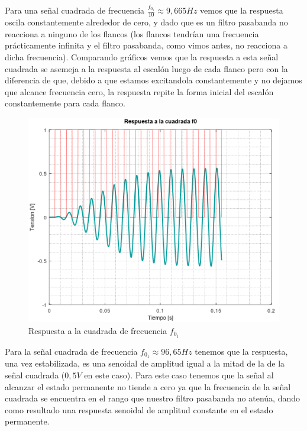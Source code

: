 \documentclass[11pt,a4paper]{report}
\begin{document}
Para una señal cuadrada de frecuencia $\frac{f_{0_{1}}}{10} \approx 9,665Hz$ vemos que 
la respuesta oscila constantemente alrededor de cero, y dado que es un filtro pasabanda no reacciona a ninguno de los flancos (los flancos tendrían una frecuencia
prácticamente infinita y el filtro pasabanda, como vimos antes, no reacciona a dicha frecuencia). Comparando gráficos vemos que la respuesta a esta señal cuadrada se asemeja a la respuesta al escalón luego de cada flanco pero con la diferencia de que, debido a que estamos excitandola constantemente y no dejamos que alcance frecuencia cero, la respuesta repite la forma inicial del escalón constantemente para cada flanco.

\bigskip
\begin{figure}[h!]
\includegraphics[scale=1]{RtaCuadradaWo12.png}
\caption{Respuesta a la cuadrada de frecuencia $f_{0_{1}}$}
\end{figure}

Para la señal cuadrada de frecuencia $f_{0_{1}} \approx 96,65Hz$ tenemos que la 
respuesta, una vez estabilizada, es una senoidal de amplitud igual a la mitad de la 
de la señal cuadrada ($0,5V$ en este caso). Para este caso tenemos que la señal al alcanzar el estado permanente no tiende a cero ya que la frecuencia de la señal cuadrada se encuentra en el rango que nuestro filtro pasabanda no atenúa, dando como resultado una respuesta senoidal de amplitud constante en el estado permanente.
\end{document}
